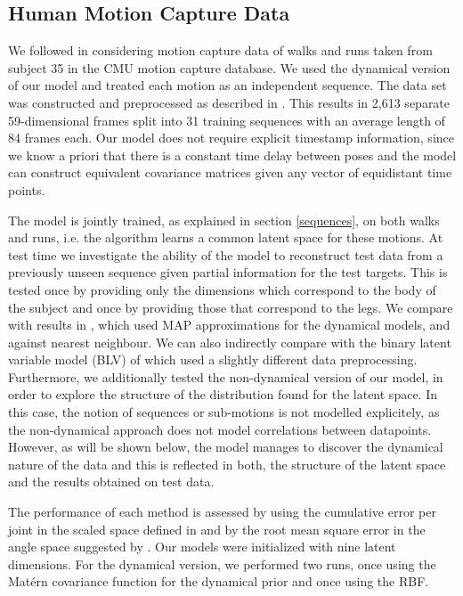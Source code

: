 \documentclass [10pt , a4paper]{article}
\begin{document}
\subsection{Human Motion Capture Data}

We followed \cite{Taylor,gplvmLarger} in considering motion capture
data of walks and runs taken from subject 35 in the CMU motion capture
database. We used the dynamical version of our model and
treated each motion as an independent sequence.  The data
set was constructed and preprocessed as described in
\cite{gplvmLarger}. This results in 2,613 separate 59-dimensional
frames split into 31 training sequences with an average length of 84
frames each. Our model does not require explicit timestamp information, since we
know a priori that there is a constant time delay between poses and the model can construct
equivalent covariance matrices given any vector of equidistant time points.

The model is jointly trained, as explained in section \ref{sequences},
on both walks and runs, i.e. the algorithm learns a common latent
space for these motions. At test time we investigate the ability of
the model to reconstruct test data from a previously unseen sequence
given partial information for the test targets. This is tested once by
providing only the dimensions which correspond to the body of the
subject and once by providing those that correspond to the legs.
%
We compare with results in \cite{gplvmLarger}, which used MAP
approximations for the dynamical models, and against nearest
neighbour. We can also indirectly compare with the binary latent
variable model (BLV) of \cite{Taylor} which used a slightly different
data preprocessing. Furthermore, we additionally tested the non-dynamical
version of our model, in order to explore the structure of the distribution found for the
latent space. In this case, the notion of sequences or sub-motions is not modelled
explicitely, as the non-dynamical approach does not model correlations between
datapoints. However, as will be shown below, the model manages to discover
the dynamical nature of the data and this is reflected in both, the structure of
the latent space and the results obtained on test data.

\par The performance of each method is assessed by using the cumulative
error per joint in the scaled space defined in \cite{Taylor} and by
the root mean square error in the angle space suggested by
\cite{gplvmLarger}. Our models were initialized with nine latent
dimensions. For the dynamical version, we performed two runs, once using the Mat\'ern covariance
function for the dynamical prior and once using the RBF.
\end{document}
